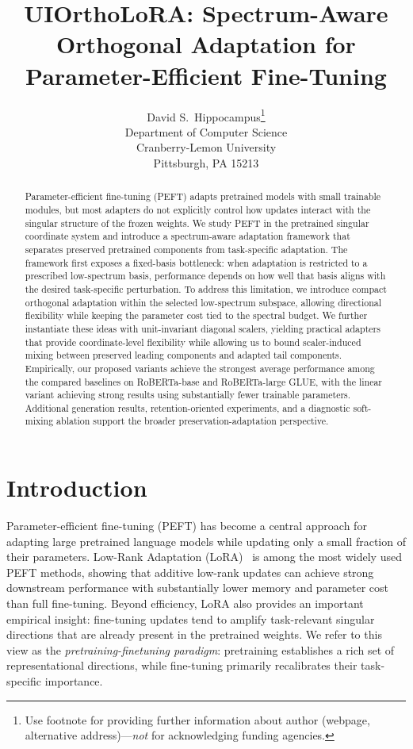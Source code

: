 \documentclass{article}
\title{UIOrthoLoRA: Spectrum-Aware Orthogonal Adaptation for Parameter-Efficient Fine-Tuning}
\author{%
  David S.~Hippocampus\thanks{Use footnote for providing further information
    about author (webpage, alternative address)---\emph{not} for acknowledging
    funding agencies.} \\
  Department of Computer Science\\
  Cranberry-Lemon University\\
  Pittsburgh, PA 15213 \\
}
\begin{document}
\maketitle

\begin{abstract}
Parameter-efficient fine-tuning (PEFT) adapts pretrained models with small trainable modules, but most adapters do not explicitly control how updates interact with the singular structure of the frozen weights. We study PEFT in the pretrained singular coordinate system and introduce a spectrum-aware adaptation framework that separates preserved pretrained components from task-specific adaptation. The framework first exposes a fixed-basis bottleneck: when adaptation is restricted to a prescribed low-spectrum basis, performance depends on how well that basis aligns with the desired task-specific perturbation. To address this limitation, we introduce compact orthogonal adaptation within the selected low-spectrum subspace, allowing directional flexibility while keeping the parameter cost tied to the spectral budget. We further instantiate these ideas with unit-invariant diagonal scalers, yielding practical adapters that provide coordinate-level flexibility while allowing us to bound scaler-induced mixing between preserved leading components and adapted tail components. Empirically, our proposed variants achieve the strongest average performance among the compared baselines on RoBERTa-base and RoBERTa-large GLUE, with the linear variant achieving strong results using substantially fewer trainable parameters. Additional generation results, retention-oriented experiments, and a diagnostic
soft-mixing ablation support the broader preservation-adaptation perspective.
\end{abstract}


\section{Introduction}
Parameter-efficient fine-tuning (PEFT) has become a central approach for adapting large pretrained language models while updating only a small fraction of their parameters. Low-Rank Adaptation (LoRA)~\citep{hu2022lora} is among the most widely used PEFT methods, showing that additive low-rank updates can achieve strong downstream performance with substantially lower memory and parameter cost than full fine-tuning. Beyond efficiency, LoRA also provides an important empirical insight: fine-tuning updates tend to amplify task-relevant singular directions that are already present in the pretrained weights. We refer to this view as the \emph{pretraining-finetuning paradigm}: pretraining establishes a rich set of representational directions, while fine-tuning primarily recalibrates their task-specific importance.
\end{document}
